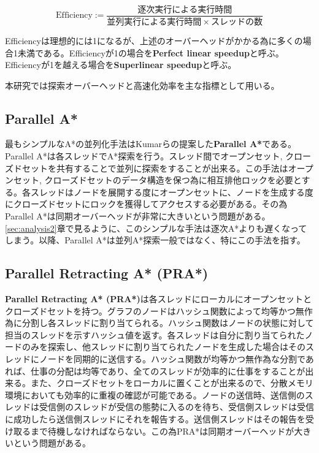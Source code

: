 \documentclass[uplatex]{jsarticle}
\begin{document}
\begin{equation}
	\mbox{Efficiency} := \frac{逐次実行による実行時間}{並列実行による実行時間 \times スレッドの数} 
\end{equation}

Efficiencyは理想的には1になるが、上述のオーバーヘッドがかかる為に多くの場合1未満である。Efficiencyが1の場合を\textbf{Perfect linear speedup}と呼ぶ。Efficiencyが1を越える場合を\textbf{Superlinear speedup}と呼ぶ。

本研究では探索オーバーヘッドと高速化効率を主な指標として用いる。

\subsection{Parallel A*}
最もシンプルなA*の並列化手法はKumarらの提案した\textbf{Parallel A*}である\cite{Kumar1988parallel}。Parallel A*は各スレッドでA*探索を行う。スレッド間でオープンセット, クローズドセットを共有することで並列に探索をすることが出来る。この手法はオープンセット, クローズドセットのデータ構造を保つ為に相互排他ロックを必要とする。各スレッドはノードを展開する度にオープンセットに、ノードを生成する度にクローズドセットにロックを獲得してアクセスする必要がある。その為Parallel A*は同期オーバーヘッドが非常に大きいという問題がある。\ref{sec:analysis2}章で見るように、このシンプルな手法は逐次A*よりも遅くなってしまう。以降、Parallel A*は並列A*探索一般ではなく、特にこの手法を指す。


\subsection{Parallel Retracting A* (PRA*)}

\textbf{Parallel Retracting A* (PRA*)}は各スレッドにローカルにオープンセットとクローズドセットを持つ\cite{evett1995massively}。グラフのノードはハッシュ関数によって均等かつ無作為に分割し各スレッドに割り当てられる。ハッシュ関数はノードの状態に対して担当のスレッドを示すハッシュ値を返す。各スレッドは自分に割り当てられたノードのみを探索し、他スレッドに割り当てられたノードを生成した場合はそのスレッドにノードを同期的に送信する。ハッシュ関数が均等かつ無作為な分割であれば、仕事の分配は均等であり、全てのスレッドが効率的に仕事をすることが出来る。また、クローズドセットをローカルに置くことが出来るので、分散メモリ環境においても効率的に重複の確認が可能である。ノードの送信時、送信側のスレッドは受信側のスレッドが受信の態勢に入るのを待ち、受信側スレッドは受信に成功したら送信側スレッドにそれを報告する。送信側スレッドはその報告を受け取るまで待機しなければならない。この為PRA*は同期オーバーヘッドが大きいという問題がある。
\newline
\end{document}
